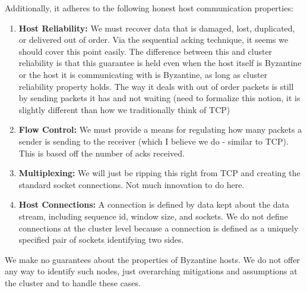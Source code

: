 Additionally, it adheres to the following honest host communication properties:
\begin{enumerate}
    \item \textbf{Host Reliability:} We must recover data that is damaged, lost, duplicated, or delivered out of order. Via the sequential acking technique, it seems we should cover this point easily. The difference between this and cluster reliability is that this guarantee is held even when the host itself is Byzantine or the host it is communicating with is Byzantine, as long as cluster reliability property holds. The way it deals with out of order packets is still by sending packets it has and not waiting (need to formalize this notion, it is slightly different than how we traditionally think of TCP)
	\item \textbf{Flow Control:} We must provide a means for regulating how many packets a sender is sending to the receiver (which I believe we do - similar to TCP). This is based off the number of acks received.
    \item \textbf{Multiplexing:} We will just be ripping this right from TCP and creating the standard socket connections. Not much innovation to do here.
    \item \textbf{Host Connections:} A connection is defined by data kept about the data stream, including sequence id, window size, and sockets. We do not define connections at the cluster level because a connection is defined as a uniquely specified pair of sockets identifying two sides.
\end{enumerate}
We make no guarantees about the properties of Byzantine hosts. We do not offer any way to identify such nodes, just overarching mitigations and assumptions at the cluster and to handle these cases.

